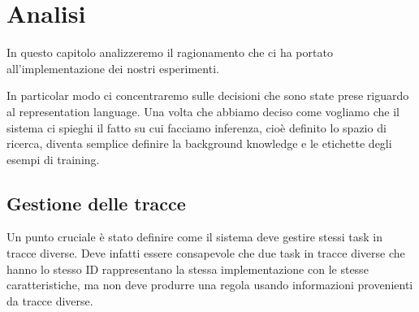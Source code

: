 \chapter{Analisi}
\label{cap:analisi}
In questo capitolo analizzeremo il ragionamento che ci ha portato all'implementazione dei nostri esperimenti.

In particolar modo ci concentraremo sulle decisioni che sono state prese riguardo al representation language. Una volta che abbiamo deciso come vogliamo che il sistema ci spieghi il fatto su cui facciamo inferenza, cioè definito lo spazio di ricerca, diventa semplice definire la background knowledge e le etichette degli esempi di training.

\section{Gestione delle tracce}
Un punto cruciale è stato definire come il sistema deve gestire stessi task in tracce diverse. Deve infatti essere consapevole che due task in tracce diverse che hanno lo stesso ID rappresentano la stessa implementazione con le stesse caratteristiche, ma non deve produrre una regola usando informazioni provenienti da tracce diverse.

